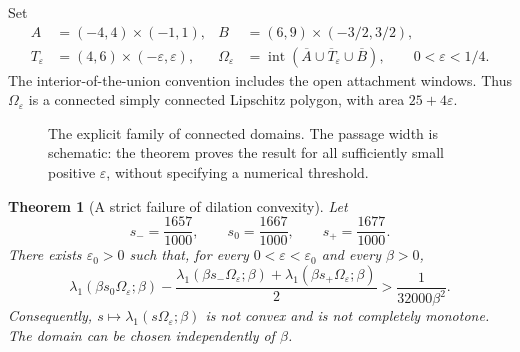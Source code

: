 \documentclass[11pt,a4paper]{article}
\newtheorem{theorem}{Theorem}[section]
\theoremstyle{definition}\newtheorem{definition}[theorem]{Definition}
\theoremstyle{remark}\newtheorem{remark}[theorem]{Remark}
\DeclareMathOperator{\interior}{int}
\begin{document}
Set
\begin{align}
 A&=(-4,4)\times(-1,1),&
 B&=(6,9)\times(-3/2,3/2),\label{eq:chambers}\\
 T_\varepsilon&=(4,6)\times(-\varepsilon,\varepsilon),&
 \Omega_\varepsilon
 &=\interior(\overline A\cup\overline T_\varepsilon\cup\overline B),
 \qquad 0<\varepsilon<1/4.\label{eq:domain}
\end{align}
The interior-of-the-union convention includes the open attachment
windows. Thus $\Omega_\varepsilon$ is a connected simply connected
Lipschitz polygon, with area $25+4\varepsilon$.

\begin{figure}[ht]
\centering
{}
\caption{The explicit family of connected domains. The passage width
is schematic: the theorem proves the result for all sufficiently
small positive $\varepsilon$, without specifying a numerical threshold.}
\label{fig:domain}
\end{figure}

\begin{theorem}[A strict failure of dilation convexity]\label{thm:main}
Let
\begin{equation}\label{eq:scales}
 s_- =\frac{1657}{1000},\qquad
 s_0 =\frac{1667}{1000},\qquad
 s_+ =\frac{1677}{1000}.
\end{equation}
There exists $\varepsilon_0>0$ such that, for every
$0<\varepsilon<\varepsilon_0$ and every $\beta>0$,
\begin{equation}\label{eq:main-gap}
 \lambda_1(\beta s_0\Omega_\varepsilon;\beta)
 -\frac{\lambda_1(\beta s_-\Omega_\varepsilon;\beta)
       +\lambda_1(\beta s_+\Omega_\varepsilon;\beta)}2
 >\frac1{32000\beta^2}.
\end{equation}
Consequently, $s\mapsto\lambda_1(s\Omega_\varepsilon;\beta)$
is not convex and is not completely monotone. The domain can be
chosen independently of $\beta$.
\end{theorem}
\end{document}
